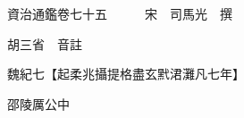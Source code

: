 










 


 
 


 

  
  
  
  
  





  
  
  
  
  
 
  

  

  
  
  



  

 
 

  
   




  

  
  


  　　資治通鑑卷七十五　　　宋　司馬光　撰

　　胡三省　音註

　　魏紀七【起柔兆攝提格盡玄黓涒灘凡七年】

　　邵陵厲公中

